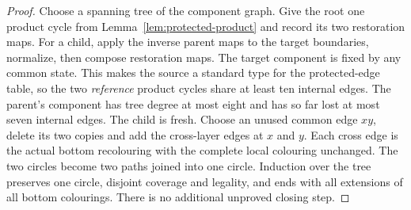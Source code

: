 \documentclass[11pt]{article}
\theoremstyle{remark}
\numberwithin{equation}{section}
\numberwithin{table}{section}
\begin{document}
\begin{proof}
Choose a spanning tree of the component graph. Give the root one
product cycle from Lemma~\ref{lem:protected-product} and record its
two restoration maps. For a child, apply the inverse parent maps
to the target boundaries, normalize, then compose restoration maps.
The target component is fixed by any common state. This makes the
source a standard type for the protected-edge table, so the
two \emph{reference} product cycles share at least ten internal edges.
The parent's component has tree degree at most eight and has so far
lost at most seven internal edges. The child is fresh.
Choose an unused common edge $xy$, delete its two copies and add
the cross-layer edges at $x$ and $y$. Each cross edge is the actual
bottom recolouring with the complete local colouring unchanged.
The two circles become two paths joined into one circle.
Induction over the tree preserves one circle, disjoint coverage and
legality, and ends with all extensions of all bottom colourings.
There is no additional unproved closing step.
\end{proof}
\end{document}
